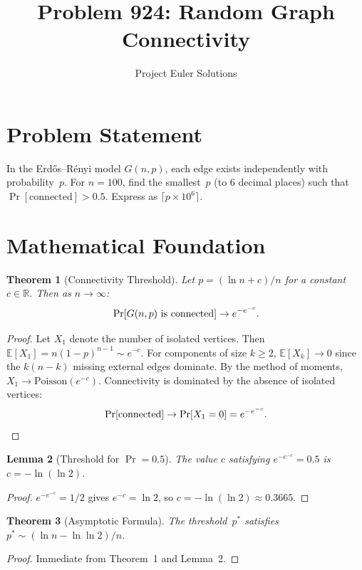 \documentclass[11pt]{article}
\title{Problem 924: Random Graph Connectivity}
\author{Project Euler Solutions}
\date{}
\newtheorem{theorem}{Theorem}
\newtheorem{lemma}[theorem]{Lemma}
\theoremstyle{definition}
\begin{document}
\maketitle

\section{Problem Statement}

In the Erd\H{o}s--R\'enyi model $G(n,p)$, each edge exists independently with probability~$p$. For $n=100$, find the smallest~$p$ (to 6 decimal places) such that $\Pr[\text{connected}] > 0.5$. Express as $\lceil p \times 10^6 \rceil$.

\section{Mathematical Foundation}

\begin{theorem}[Connectivity Threshold]
Let $p = (\ln n + c)/n$ for a constant $c \in \mathbb{R}$. Then as $n \to \infty$:
\[
\Pr[G(n,p) \textup{ is connected}] \to e^{-e^{-c}}.
\]
\end{theorem}

\begin{proof}
Let $X_1$ denote the number of isolated vertices. Then $\mathbb{E}[X_1] = n(1-p)^{n-1} \sim e^{-c}$. For components of size $k \geq 2$, $\mathbb{E}[X_k] \to 0$ since the $k(n-k)$ missing external edges dominate. By the method of moments, $X_1 \to \mathrm{Poisson}(e^{-c})$. Connectivity is dominated by the absence of isolated vertices:
\[
\Pr[\text{connected}] \to \Pr[X_1 = 0] = e^{-e^{-c}}. \qedhere
\]
\end{proof}

\begin{lemma}[Threshold for $\Pr = 0.5$]
The value $c$ satisfying $e^{-e^{-c}} = 0.5$ is $c = -\ln(\ln 2)$.
\end{lemma}

\begin{proof}
$e^{-e^{-c}} = 1/2$ gives $e^{-c} = \ln 2$, so $c = -\ln(\ln 2) \approx 0.3665$.
\end{proof}

\begin{theorem}[Asymptotic Formula]
The threshold~$p^*$ satisfies $p^* \sim (\ln n - \ln\ln 2)/n$.
\end{theorem}

\begin{proof}
Immediate from Theorem~1 and Lemma~2.
\end{proof}
\end{document}
